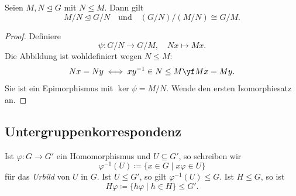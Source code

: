 \documentclass[11pt]{article}
\begin{document}
\begin{theorem}\Theorem
  Seien $M, N \trianglelefteq G$ mit $N \le M$. Dann gilt
  \[ M/N \trianglelefteq G/N \quad \text{und} \quad (G/N)/(M/N) \cong G/M. \]
\end{theorem}
\begin{proof}
  Definiere
  \[ \psi\colon G/N \longrightarrow G/M, \quad Nx \longmapsto Mx. \]
  Die Abbildung ist wohldefiniert wegen $N \le M$:
  \[ Nx = Ny \iff xy^{-1} \in N \le M \yf Mx = My. \]
  Sie ist ein Epimorphismus mit $\ker \psi = M/N$. Wende den ersten Isomorphiesatz an.
\end{proof}


\subsection{Untergruppenkorrespondenz}

Ist $\varphi\colon G \to G'$ ein Homomorphismus und $U \subseteq G'$, so schreiben wir
\[ \varphi^{-1}(U) \coloneqq \{x \in G \mid x\varphi \in U\} \]
für das \emph{Urbild} von $U$ in $G$.
Ist $U \le G'$, so gilt $\varphi^{-1}(U) \le G$.
Ist $H \le G$, so ist
\[ H\varphi \coloneqq \{h\varphi \mid h \in H\} \le G'. \]
\end{document}
